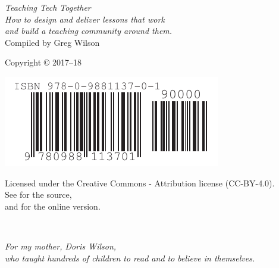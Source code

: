 \pagestyle{empty}

{\begingroup
  \raggedleft
  \vspace*{\baselineskip}

  {\Huge\itshape Teaching Tech Together}\\[\baselineskip]

  {\large\itshape
    How to design and deliver lessons that work \\
    and build a teaching community around them.
  }\\[0.2\textheight]

  {\large Compiled by Greg Wilson}\par

  \vfill

  {\large Copyright {\copyright} 2017--18}

  \vspace*{\baselineskip}

  \includegraphics{../files/isbn-barcode.pdf}

  \vspace*{\baselineskip}

  {\small
    Licensed under the Creative Commons - Attribution license (CC-BY-4.0).
    \\
    See {\repository} for the source,\\
    and {\website} for the online version.
  }

\endgroup}

\newpage

\pagestyle{empty}

~

\newpage

\pagestyle{empty}

\vspace*{1.5in}

\begin{center}
{\em
For my mother, Doris Wilson,\\
who taught hundreds of children to read and to believe in themselves.
}
\end{center}

\vspace*{3\baselineskip}

